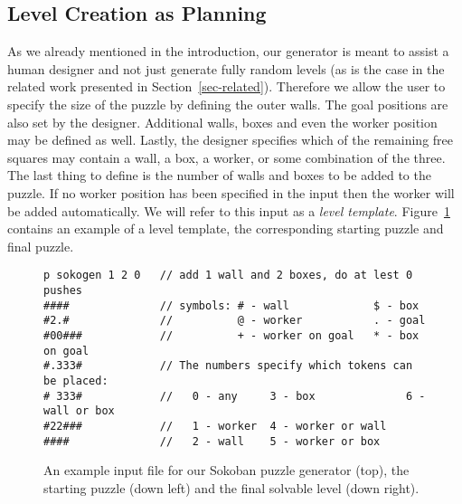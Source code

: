 \documentclass[runningheads]{llncs}
\begin{document}
\subsection{Level Creation as Planning}
As we already mentioned in the introduction, our generator is meant to assist a
human designer and not just generate fully random levels (as is the case in the
related work presented in Section~\ref{sec-related}). Therefore we allow the
user to specify the size of the puzzle by defining the outer walls. The goal
positions are also set by the designer.
Additional walls, boxes and even the
worker position may be defined as well. Lastly, the designer specifies which of the remaining free squares may contain
a wall, a box, a worker, or some combination of the three. The last thing to define
is the number of walls and boxes to be added to the puzzle.
If no worker position has been specified in the input then
the worker will be added automatically. We will refer to this input as a \emph{level template}.
Figure~\ref{fig-input} contains an example of a level template, the
corresponding starting puzzle and final puzzle.

\begin{figure}
\begin{verbatim}
p sokogen 1 2 0   // add 1 wall and 2 boxes, do at lest 0 pushes
####              // symbols: # - wall             $ - box
#2.#              //          @ - worker           . - goal
#00###            //          + - worker on goal   * - box on goal
#.333#            // The numbers specify which tokens can be placed:
# 333#            //   0 - any     3 - box              6 - wall or box
#22###            //   1 - worker  4 - worker or wall
####              //   2 - wall    5 - worker or box
\end{verbatim}
\centering
\w\w\w\w\e\e\e\e\w\w\w\w\e\e\n
\w\e\g\w\e\e\e\e\w\w\g\w\e\e\n
\w\e\e\w\w\w\e\e\w\e\p\w\w\w\n
\w\g\e\e\e\w\e\e\w\g\x\x\e\w\n
\w\e\e\e\e\w\e\e\w\e\e\e\e\w\n
\w\e\e\w\w\w\e\e\w\e\e\w\w\w\n
\w\w\w\w\e\e\e\e\w\w\w\w\e\e\n

\caption{An example input file for our Sokoban puzzle generator (top), the starting puzzle (down left)
and the final solvable level (down right).}
\label{fig-input}
\end{figure}
\end{document}
